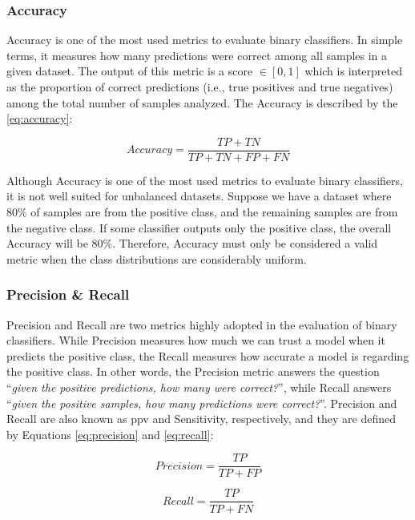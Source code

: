 \subsubsection{Accuracy}

Accuracy is one of the most used metrics to evaluate binary classifiers. In simple terms, it measures how many predictions were correct among all samples in a given dataset. The output of this metric is a score $\in [0, 1]$ which is interpreted as the proportion of correct predictions (i.e., true positives and true negatives) among the total number of samples analyzed. The Accuracy is described by the \autoref{eq:accuracy}:

\begin{equation}
\label{eq:accuracy}
Accuracy = \frac{TP + TN}{TP + TN + FP + FN}
\end{equation}

Although Accuracy is one of the most used metrics to evaluate binary classifiers, it is not well suited for unbalanced datasets. Suppose we have a dataset where 80\% of samples are from the positive class, and the remaining samples are from the negative class. If some classifier outputs only the positive class, the overall Accuracy will be 80\%. Therefore, Accuracy must only be considered a valid metric when the class distributions are considerably uniform.

\subsubsection{Precision \& Recall} \label{precision-recall}

Precision and Recall are two metrics highly adopted in the evaluation of binary classifiers. While Precision measures how much we can trust a model when it predicts the positive class, the Recall measures how accurate a model is regarding the positive class. In other words, the Precision metric answers the question ``\textit{given the positive predictions, how many were correct?}'', while Recall answers ``\textit{given the positive samples, how many predictions were correct?}''. Precision and Recall are also known as \acf{ppv} and Sensitivity, respectively, and they are defined by Equations \ref{eq:precision} and \ref{eq:recall}: 

\begin{equation}
\label{eq:precision}
Precision = \frac{TP}{TP + FP}
\end{equation}

\begin{equation}
\label{eq:recall}
Recall = \frac{TP}{TP + FN}
\end{equation}


